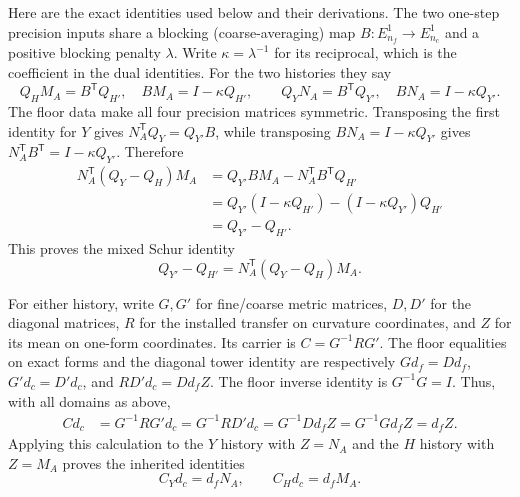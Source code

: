 Here are the exact identities used below and their derivations. The two
one-step precision inputs share a blocking (coarse-averaging) map $B:E_{n_f}^1\to E_{n_c}^1$ and
a positive blocking penalty $\lambda$. Write $\kappa=\lambda^{-1}$ for its
reciprocal, which is the coefficient in the dual identities. For the two
histories they say
\[
 Q_HM_A=B^{\mathsf T}Q_{H'},\quad BM_A=I-\kappa Q_{H'},\qquad
 Q_YN_A=B^{\mathsf T}Q_{Y'},\quad BN_A=I-\kappa Q_{Y'}.
\]
The floor data make all four precision matrices symmetric. Transposing the
first identity for $Y$ gives $N_A^{\mathsf T}Q_Y=Q_{Y'}B$, while transposing
$BN_A=I-\kappa Q_{Y'}$ gives $N_A^{\mathsf T}B^{\mathsf T}=I-\kappa Q_{Y'}$.
Therefore
\[
\begin{split}
 N_A^{\mathsf T}(Q_Y-Q_H)M_A
 &=Q_{Y'}BM_A-N_A^{\mathsf T}B^{\mathsf T}Q_{H'}\\
 &=Q_{Y'}(I-\kappa Q_{H'})-(I-\kappa Q_{Y'})Q_{H'}\\
 &=Q_{Y'}-Q_{H'}.
\end{split}
\]
This proves the mixed Schur identity
\begin{equation}
 Q_{Y'}-Q_{H'}=N_A^{\mathsf T}(Q_Y-Q_H)M_A.
 \label{eq:ex-lattice-flat-step-schur}
\end{equation}

For either history, write $G,G'$ for fine/coarse metric matrices, $D,D'$ for
the diagonal matrices, $R$ for the installed transfer on curvature
coordinates, and $Z$ for its mean on one-form coordinates. Its carrier is
$C=G^{-1}RG'$. The floor equalities on exact forms and the diagonal tower
identity are respectively
$Gd_f=Dd_f$, $G'd_c=D'd_c$, and $RD'd_c=Dd_fZ$. The floor inverse identity
is $G^{-1}G=I$. Thus, with all domains as above,
\[
\begin{split}
 Cd_c&=G^{-1}RG'd_c
      =G^{-1}RD'd_c
      =G^{-1}Dd_fZ
      =G^{-1}Gd_fZ
      =d_fZ.
\end{split}
\]
Applying this calculation to the $Y$ history with $Z=N_A$ and the $H$ history
with $Z=M_A$ proves the inherited identities
\begin{equation}
 C_Yd_c=d_fN_A,\qquad C_Hd_c=d_fM_A.
 \label{eq:ex-lattice-flat-step-inherited}
\end{equation}

